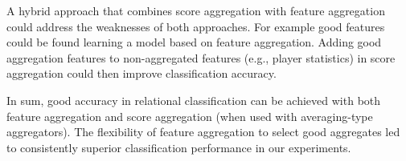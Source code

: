\documentclass[conference]{IEEEtran}
\begin{document}
A hybrid approach that combines score aggregation with feature aggregation could address the weaknesses of both approaches.
For example good features could be found learning a model based on feature aggregation. Adding  good aggregation features to non-aggregated features (e.g., player statistics) in score aggregation could then improve classification accuracy.

In sum, good accuracy in relational classification can be achieved with both feature aggregation and score aggregation (when used with averaging-type aggregators). The flexibility of feature aggregation to select good aggregates led to consistently superior classification performance in our experiments.













%
%
%






\end{document}
